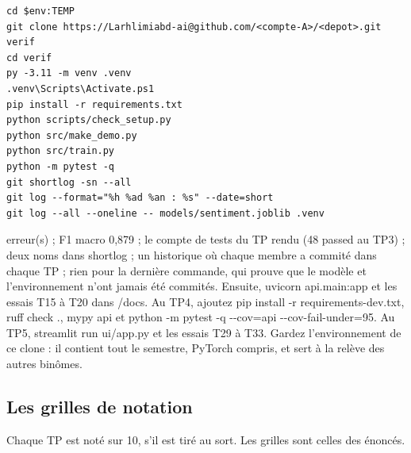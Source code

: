 \documentclass[11pt,a4paper]{article}
\newcommand{\co}[1]{{\ttfamily\hyphenchar\font=45\relax #1}}
\begin{document}
\begin{lstlisting}
cd $env:TEMP
git clone https://Larhlimiabd-ai@github.com/<compte-A>/<depot>.git verif
cd verif
py -3.11 -m venv .venv
.venv\Scripts\Activate.ps1
pip install -r requirements.txt
python scripts/check_setup.py
python src/make_demo.py
python src/train.py
python -m pytest -q
git shortlog -sn --all
git log --format="%h %ad %an : %s" --date=short
git log --all --oneline -- models/sentiment.joblib .venv
\end{lstlisting}

\begin{attendu}
\co{0 erreur(s)} ; F1 macro 0,879 ; le compte de tests du TP rendu (48 passed au TP3) ; deux noms dans
\co{shortlog} ; un historique où chaque membre a commité dans chaque TP ; rien pour la dernière commande, qui
prouve que le modèle et l'environnement n'ont jamais été commités. Ensuite,
\co{uvicorn api.main:app} et les essais T15 à T20 dans \co{/docs}. Au TP4, ajoutez
\co{pip install -r requirements-dev.txt}, \co{ruff check .}, \co{mypy api} et
\co{python -m pytest -q -{}-cov=api -{}-cov-fail-under=95}. Au TP5, \co{streamlit run ui/app.py} et les
essais T29 à T33. Gardez l'environnement de ce clone : il contient tout
le semestre, PyTorch compris, et sert à la relève des autres binômes.
\end{attendu}

\subsection{Les grilles de notation}

Chaque TP est noté sur 10, s'il est tiré au sort. Les grilles sont celles des énoncés.
\end{document}
